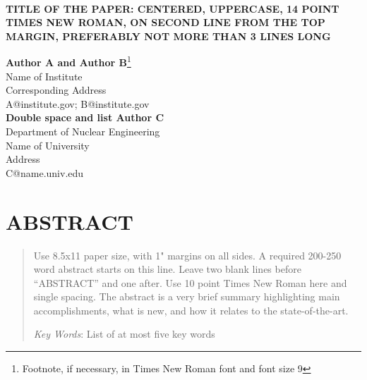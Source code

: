\documentclass{ansconf}
\begin{document}
\normalsize

\setlength{\baselineskip}{16.8pt}
\vspace{-3pt}

% 
%

\begin{center}
\textbf{\large \\%
TITLE OF THE PAPER: CENTERED, UPPERCASE, 14 POINT TIMES
NEW ROMAN, ON SECOND LINE FROM THE TOP MARGIN,
PREFERABLY NOT MORE THAN 3 LINES LONG 
}

% 
%
\setlength{\baselineskip}{14pt}
\textbf{Author A and Author B}\footnote{Footnote, if necessary, in Times 
  New Roman font and font size 9} \\
Name of Institute  \\
Corresponding Address \\
A@institute.gov; B@institute.gov \\

% 
%
\vspace{12pt}
\textbf{Double space and list Author C}\\
Department of Nuclear Engineering  \\
Name of University \\
Address \\
C@name.univ.edu\\ 
%
%

\end{center}

%
%
\raggedright


\section*{ABSTRACT} 
\begin{quote}
\begin{small}
Use 8.5x11 paper size, with 1" margins on all sides.  A required 200-250 
word abstract starts on this line.  Leave two blank lines before ``ABSTRACT''
and one after.  Use 10 point Times New Roman here and single 
spacing. The abstract is a very brief summary highlighting main 
accomplishments, what is new, and how it relates to the state-of-the-art.

\emph{Key Words}: List of at most five key words
\end{small} 
\end{quote}

\setlength{\baselineskip}{14pt}
\normalsize
\end{document}
